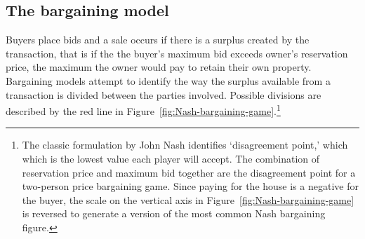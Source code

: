 %



        

\subsection{The bargaining model} \label{sec:bargaining-model}
Buyers place bids and a sale occurs if there is a surplus created by the transaction, that is if the the buyer's maximum bid exceeds owner's \gls{reservation price}, the maximum the owner would pay to retain their own property. 
Bargaining models attempt to identify the way the surplus available from a transaction is divided between the parties involved. Possible divisions are described by the red line in Figure~\ref{fig:Nash-bargaining-game}.\footnote{The classic  formulation by John Nash %
identifies  `\gls{disagreement point},' which which is the  lowest value each player will accept. The combination of reservation price and maximum bid together are the disagreement point for a two-person price bargaining game. Since paying for the house is a negative for the buyer, the scale on the vertical axis  in Figure~\ref{fig:Nash-bargaining-game} is reversed to generate a version of the most common Nash bargaining figure.} 

